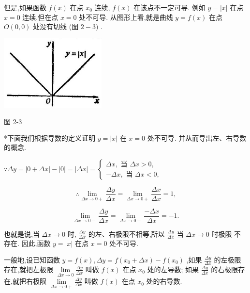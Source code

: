 \documentclass[lang=cn,newtx,12pt,scheme=chinese]{elegantbook}
\begin{document}
但是,如果函数 \(f\left( x\right)\) 在点 \({x}_{0}\) 连续, \(f\left( x\right)\) 在该点不一定可导. 例如 \(y = \left| x\right|\) 在点 \(x = 0\) 连续,但在点 \(x = 0\) 处不可导. 从图形上看,就是曲线 \(y = f\left( x\right)\) 在点 \(O\left( {0,0}\right)\) 处没有切线 (图 \(2 - 3)\) .

\begin{center}
\includegraphics[max width=0.4\textwidth]{images/01912c18-5c3f-733d-b775-749ba9897a9d_69_933568.jpg}
\end{center}

图 2-3

*下面我们根据导数的定义证明 \(y = \left| x\right|\) 在 \(x = 0\) 处不可导. 并从而导出左、右导数的概念.

\(\because {\Delta y} = \left| {0 + {\Delta x}}\right| - \left| 0\right| = \left| {\Delta x}\right| = \left\{ \begin{array}{r} {\Delta x},\text{ 当 }{\Delta x} > 0, \\ - {\Delta x},\text{ 当 }{\Delta x} < 0, \end{array}\right.\)

\[
\therefore \mathop{\lim }\limits_{{{\Delta x} \rightarrow 0 + }}\frac{\Delta y}{\Delta x} = \mathop{\lim }\limits_{{{\Delta x} \rightarrow 0 + }}\frac{\Delta x}{\Delta x} = 1\text{,}
\]

\[
\mathop{\lim }\limits_{{{\Delta x} \rightarrow 0 - }}\frac{\Delta y}{\Delta x} = \mathop{\lim }\limits_{{{\Delta x} \rightarrow 0 - }}\frac{-{\Delta x}}{\Delta x} = - 1.
\]

也就是说,当 \({\Delta x} \rightarrow 0\) 时, \(\frac{\Delta y}{\Delta x}\) 的左、右极限不相等,所以 \(\frac{\Delta y}{\Delta x}\) 当 \({\Delta x} \rightarrow 0\) 时极限 不存在. 因此,函数 \(y = \left| x\right|\) 在点 \(x = 0\) 处不可导.

\begin{definition}[单侧导数]
一般地,设已知函数 \(y = f\left( x\right) ,{\Delta y} = f\left( {{x}_{0} + {\Delta x}}\right) - f\left( {x}_{0}\right)\) ,如果 \(\frac{\Delta y}{\Delta x}\) 的左极限存在,就把左极限 \(\mathop{\lim }\limits_{{{\Delta x} \rightarrow 0}}\frac{\Delta y}{\Delta x}\) 叫做 \(f\left( x\right)\) 在点 \({x}_{0}\) 处的左导数; 如果 \(\frac{\Delta y}{\Delta x}\) 的右极限存在,就把右极限 \(\mathop{\lim }\limits_{{{\Delta x} \rightarrow 0 + }}\frac{\Delta y}{\Delta x}\) 叫做 \(f\left( x\right)\) 在点 \({x}_{0}\) 处的右导数.
\end{definition}
\end{document}
